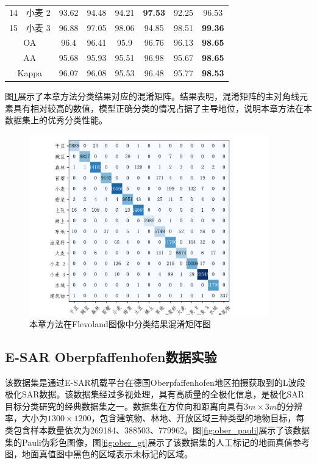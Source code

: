 \begin{table}[ht!]
\begin{tabular}{cccccccc}
        14                        & 小麦 2  & 93.62          & 94.48 & 94.21 & \textbf{97.53} & 92.25          & 96.53          \\
        15                        & 小麦 3  & 96.88          & 97.05 & 98.06 & 94.85          & 98.51          & \textbf{99.36} \\
        \midrule[0.75bp]
        \multicolumn{2}{c}{OA}    & 96.4  & 96.41          & 95.9  & 96.76 & 96.13          & \textbf{98.65}                  \\
        \multicolumn{2}{c}{AA}    & 95.68 & 95.93          & 95.51 & 96.98 & 95.67          & \textbf{98.65}                  \\
        \multicolumn{2}{c}{Kappa} & 96.07 & 96.08          & 95.53 & 96.48 & 95.77          & \textbf{98.53}                  \\
        \bottomrule[1.5bp]
    \end{tabular}
\end{table}

图\ref{fig:fle_conf_matrix}展示了本章方法分类结果对应的混淆矩阵。结果表明，混淆矩阵的主对角线元素具有相对较高的数值，模型正确分类的情况占据了主导地位，说明本章方法在本数据集上的优秀分类性能。

\begin{figure}[h]
    \centering
    \includegraphics[width=10.4cm]{pic/chapter3/fle/conf-matrix.pdf}
    \caption{本章方法在Flevoland图像中分类结果混淆矩阵图}
    \label{fig:fle_conf_matrix}
\end{figure}


\subsection{E-SAR Oberpfaffenhofen数据实验}
该数据集是通过E-SAR机载平台在德国Oberpfaffenhofen地区拍摄获取到的L波段极化SAR数据。该数据集经过多视处理，具有高质量的全极化信息，是极化SAR目标分类研究的经典数据集之一。数据集在方位向和距离向具有$3m \times 3m$的分辨率，大小为$1300 \times 1200$，包含建筑物、林地、开放区域三种类型的地物目标，每类包含样本数量依次为269184、388503、779962。图\ref{fig:ober_pauli}展示了该数据集的Pauli伪彩色图像，图\ref{fig:ober_gt}展示了该数据集的人工标记的地面真值参考图，地面真值图中黑色的区域表示未标记的区域。

